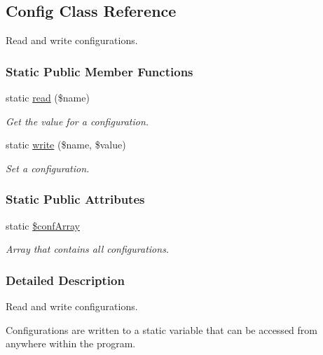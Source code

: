 \hypertarget{classConfig}{\subsection{Config Class Reference}
\label{classConfig}
}


Read and write configurations.  


\subsubsection*{Static Public Member Functions}
\begin{DoxyCompactItemize}
\item 
static \hyperlink{classConfig_a05b671c1d9906d653dfab37fc5dc1588}{read} (\$name)
\begin{DoxyCompactList}\small\item\em Get the value for a configuration. \end{DoxyCompactList}\item 
static \hyperlink{classConfig_a975f9e49fe4636732dbffacc62e3dbd9}{write} (\$name, \$value)
\begin{DoxyCompactList}\small\item\em Set a configuration. \end{DoxyCompactList}\end{DoxyCompactItemize}
\subsubsection*{Static Public Attributes}
\begin{DoxyCompactItemize}
\item 
\hypertarget{classConfig_abf0820c6706551fc7e0ce741c525545f}{static \hyperlink{classConfig_abf0820c6706551fc7e0ce741c525545f}{\$conf\-Array}}\label{classConfig_abf0820c6706551fc7e0ce741c525545f}

\begin{DoxyCompactList}\small\item\em Array that contains all configurations. \end{DoxyCompactList}\end{DoxyCompactItemize}


\subsubsection{Detailed Description}
Read and write configurations. 

Configurations are written to a static variable that can be accessed from anywhere within the program. 

